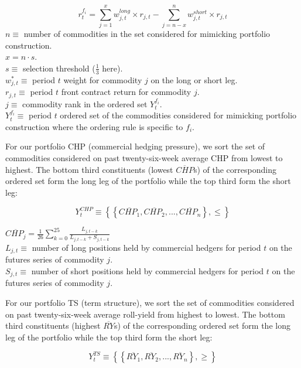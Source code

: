 \documentclass[]{elsarticle} %
\begin{document}
\[r_{t}^{f_{i}}=\sum_{j=1}^{x}w^{long}_{j,t} \times r_{j,t}-\sum_{j=n-x}^{n}w^{short}_{j,t} \times r_{j,t}\]
\(n\equiv\) number of commodities in the set considered for mimicking portfolio construction.\\
\(x = n \cdot s\).\\
\(s\equiv\) selection threshold (\(\frac{1}{3}\) here).\\
\(w^{*}_{j,t}\equiv\) period \(t\) weight for commodity \(j\) on the long or short leg.\\
\(r_{j,t}\equiv\) period \(t\) front contract return for commodity \(j\).\\
\(j\equiv\) commodity rank in the ordered set \(Y_{t}^{f_{i}}\).\\
\(Y_{t}^{f_{i}}\equiv\) period \(t\) ordered set of the commodities considered for mimicking portfolio construction where the ordering rule is specific to \(f_{i}\).

\medskip\setlength{\parindent}{0pt}

For our portfolio CHP (commercial hedging pressure), we sort the set of commodities considered on past twenty-six-week average CHP from lowest to highest. The bottom third constituents (lowest \(\overline{CHP}\)s) of the corresponding ordered set form the long leg of the portfolio while the top third form the short leg:

\[Y_{t}^{CHP}\equiv\left \{ \left \{ \overline{CHP_{1}}, \overline{CHP_{2}}, ..., \overline{CHP_{n}} \right \}, \leq \right \}\]

\(\overline{CHP_{j}}=\frac{1}{26}\sum_{k=0}^{25}\frac{L_{j,t-k}}{L_{j,t-k}+S_{j,t-k}}\)\\
\(L_{j,t}\equiv\) number of long positions held by commercial hedgers for period \(t\) on the futures series of commodity \(j\).\\
\(S_{j,t}\equiv\) number of short positions held by commercial hedgers for period \(t\) on the futures series of commodity \(j\).

\medskip\setlength{\parindent}{0pt}

For our portfolio TS (term structure), we sort the set of commodities considered on past twenty-six-week average roll-yield from highest to lowest. The bottom third constituents (highest \(\overline{RY}\)s) of the corresponding ordered set form the long leg of the portfolio while the top third form the short leg:

\[Y_{t}^{TS}\equiv\left \{ \left \{ \overline{RY_{1}}, \overline{RY_{2}}, ..., \overline{RY_{n}} \right \}, \geq \right \}\]
\end{document}
